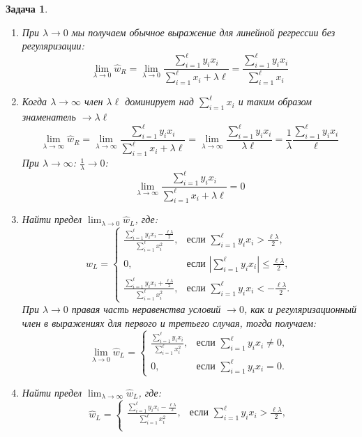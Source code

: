\documentclass[a4paper,12pt]{article}
\theoremstyle{mystyle}
\newtheorem{esProblem}{Задача}
\begin{document}
\begin{esProblem}
\begin{enumerate}
        \begin{enumerate}
   	 \item При $\lambda \to 0$ мы получаем обычное выражение для линейной регрессии без регуляризации:
  	  \[
 	   \lim_{\lambda \to 0}  \hat{w}_R =  \lim_{\lambda \to 0} \dfrac{\sum_{i=1}^{\ell} y_i x_i}{\sum_{i=1}^{\ell} x_i + \lambda \ell}  =  \dfrac{\sum_{i=1}^{\ell} y_i x_i}{\sum_{i=1}^{\ell} x_i}
 	   \]
	   \item
	   Когда $\lambda \to \infty$ член $\lambda \ell$ доминирует над  $\sum_{i=1}^{\ell} x_i$ и таким образом знаменатель $\to \lambda \ell$
	   \[
	   \lim_{\lambda \to \infty}  \hat{w}_R = \lim_{\lambda \to \infty} \dfrac{\sum_{i=1}^{\ell} y_i x_i}{\sum_{i=1}^{\ell} x_i + \lambda \ell} = \lim_{\lambda \to \infty}  \dfrac{\sum_{i=1}^{\ell} y_i x_i}{\lambda \ell} = \dfrac{1}{\lambda} \dfrac{\sum_{i=1}^{\ell} y_i x_i}{\ell} 
	   \]
	   При $\lambda \to \infty$: $\frac{1}{\lambda} \to 0$:
	   \[
	   \lim_{\lambda \to \infty} \dfrac{\sum_{i=1}^{\ell} y_i x_i}{\sum_{i=1}^{\ell} x_i + \lambda \ell} = 0
	   \]
	   \item Найти предел $\lim_{\lambda \to 0}  \hat{w}_L$, где:
	   \[
 	  \hat{w}_L = \begin{cases}
\frac{\sum_{i=1}^{\ell} y_i x_i - \frac{\ell\lambda}{2}}{\sum_{i=1}^{\ell} x_i^2}, & \text{если }
\sum_{i=1}^{\ell} y_i x_i > \frac{\ell\lambda}{2}, \\
0, & \text{если } \left|\sum_{i=1}^{\ell} y_i x_i\right| \leq \frac{\ell\lambda}{2}, \\
\frac{\sum_{i=1}^{\ell} y_i x_i + \frac{\ell\lambda}{2}}{\sum_{i=1}^{\ell} x_i^2}, & \text{если }
\sum_{i=1}^{\ell} y_i x_i < -\frac{\ell\lambda}{2}.
\end{cases}
 	   \]
	   При $\lambda \to 0$ правая часть неравенства условий $\to 0$, как и регуляризационный член в выражениях для первого и третьего случая, тогда получаем:
\[
\lim_{\lambda \to 0} \hat{w}_L = 
\begin{cases} 
\frac{\sum_{i=1}^{\ell} y_i x_i}{\sum_{i=1}^{\ell} x_i^2}, & \text{если } \sum_{i=1}^{\ell} y_i x_i \neq 0, \\
0, & \text{если } \sum_{i=1}^{\ell} y_i x_i = 0.
\end{cases}
\]
	\item Найти предел $\lim_{\lambda \to \infty}  \hat{w}_L$, где:
	   \[
 	  \hat{w}_L = \begin{cases}
\frac{\sum_{i=1}^{\ell} y_i x_i - \frac{\ell\lambda}{2}}{\sum_{i=1}^{\ell} x_i^2}, & \text{если }
\sum_{i=1}^{\ell} y_i x_i > \frac{\ell\lambda}{2}, \\

\end{cases}\]
\end{enumerate}
\end{enumerate}
\end{esProblem}
\end{document}

